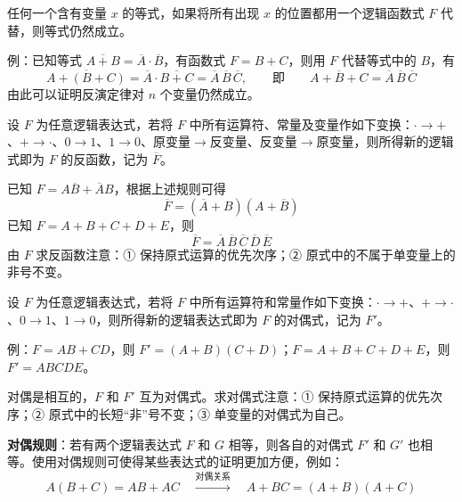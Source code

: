 \begin{definition}[代入规则]
\label{def:代入规则}
任何一个含有变量 $x$ 的等式，如果将所有出现 $x$ 的位置都用一个逻辑函数式 $F$ 代替，则等式仍然成立。

例：已知等式 $\overline{A+B}=\overline{A}\cdot\overline{B}$，有函数式 $F=B+C$，则用 $F$ 代替等式中的 $B$，有
\begin{equation}
	\overline{A+(B+C)}=\overline{A}\cdot\overline{B+C}=\overline{A}\,\overline{B}\,\overline{C},
	\qquad\text{即}\qquad \overline{A+B+C}=\overline{A}\,\overline{B}\,\overline{C}
	\label{eq:规则:代入规则}
\end{equation}
由此可以证明反演定律对 $n$ 个变量仍然成立。
\end{definition}

\begin{definition}[反演规则]
\label{def:反演规则}
设 $F$ 为任意逻辑表达式，若将 $F$ 中所有运算符、常量及变量作如下变换：$\cdot\to+$、$+\to\cdot$、$0\to1$、$1\to0$、原变量$\to$反变量、反变量$\to$原变量，则所得新的逻辑式即为 $F$ 的反函数，记为 $\overline{F}$。
\end{definition}

\begin{longexample}[求反函数]
\label{ex:反演规则}
\begin{solution}
	已知 $F=A\overline{B}+\overline{A}B$，根据上述规则可得
	\begin{equation}
		\overline{F}=(\overline{A}+B)(A+\overline{B})
		\label{eq:规则:反演例1}
	\end{equation}
	已知 $F=A+B+C+D+E$，则
	\begin{equation}
		\overline{F}=\overline{A}\,\overline{B}\,\overline{C}\,\overline{D}\,\overline{E}
		\label{eq:规则:反演例2}
	\end{equation}
	由 $F$ 求反函数注意：① 保持原式运算的优先次序；② 原式中的不属于单变量上的非号不变。
\end{solution}
\end{longexample}

\begin{definition}[对偶规则]
\label{def:对偶规则}
设 $F$ 为任意逻辑表达式，若将 $F$ 中所有运算符和常量作如下变换：$\cdot\to+$、$+\to\cdot$、$0\to1$、$1\to0$，则所得新的逻辑表达式即为 $F$ 的对偶式，记为 $F'$。

例：$F=AB+CD$，则 $F'=(A+B)(C+D)$；$F=A+B+C+D+E$，则 $F'=ABCDE$。

对偶是相互的，$F$ 和 $F'$ 互为对偶式。求对偶式注意：① 保持原式运算的优先次序；② 原式中的长短“非”号不变；③ 单变量的对偶式为自己。

\textbf{对偶规则}：若有两个逻辑表达式 $F$ 和 $G$ 相等，则各自的对偶式 $F'$ 和 $G'$ 也相等。使用对偶规则可使得某些表达式的证明更加方便，例如：
\begin{equation}
	A(B+C)=AB+AC
	\quad\xrightarrow{\text{对偶关系}}\quad
	A+BC=(A+B)(A+C)
	\label{eq:规则:对偶关系}
\end{equation}
\end{definition}

